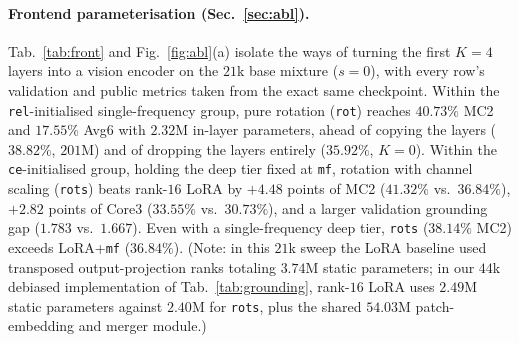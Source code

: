 \documentclass[10pt,twocolumn,letterpaper]{article}
\begin{document}
\paragraph{Frontend parameterisation (Sec.~\ref{sec:abl}).}
Tab.~\ref{tab:front} and Fig.~\ref{fig:abl}(a) isolate the ways of turning the
first $K{=}4$ layers into a vision encoder on the $21$k base mixture ($s{=}0$),
with every row's validation and public metrics taken from the exact same
checkpoint. Within the \texttt{rel}-initialised single-frequency group, pure
rotation (\texttt{rot}) reaches $40.73\%$ MC2 and $17.55\%$ Avg6 with $2.32$M
in-layer parameters, ahead of copying the layers ($38.82\%$, $201$M) and of dropping the
layers entirely ($35.92\%$, $K{=}0$). Within the \texttt{ce}-initialised group,
holding the deep tier fixed at \texttt{mf}, rotation with channel scaling
(\texttt{rots}) beats rank-$16$ LoRA by $+4.48$ points of MC2 ($41.32\%$ vs.\
$36.84\%$), $+2.82$ points of Core3 ($33.55\%$ vs.\ $30.73\%$), and a larger
validation grounding gap ($1.783$ vs.\ $1.667$). Even with a single-frequency deep
tier, \texttt{rots} ($38.14\%$ MC2) exceeds LoRA+\texttt{mf} ($36.84\%$).
(Note: in this $21$k sweep the LoRA baseline used transposed output-projection
ranks totaling $3.74$M static parameters; in our $44$k debiased implementation
of Tab.~\ref{tab:grounding}, rank-$16$ LoRA uses $2.49$M static parameters
against $2.40$M for \texttt{rots}, plus the shared $54.03$M patch-embedding and
merger module.)
\end{document}
